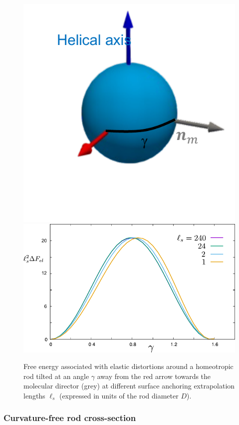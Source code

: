 \begin{figure}
	\includegraphics[width = .3\columnwidth]{figures/chapter-3/gamrods}
 \includegraphics[width = .6\columnwidth]{figures/chapter-3/fel}
	\caption{Free energy associated with elastic distortions around a homeotropic rod tilted at an angle $\gamma$ away from the red arrow towards the molecular director (grey) at different surface anchoring extrapolation lengths $\ell_{s}$ (expressed in units of the rod diameter $D$).   }
	\label{fel}
\end{figure}




\subsubsection{Curvature-free rod cross-section}

